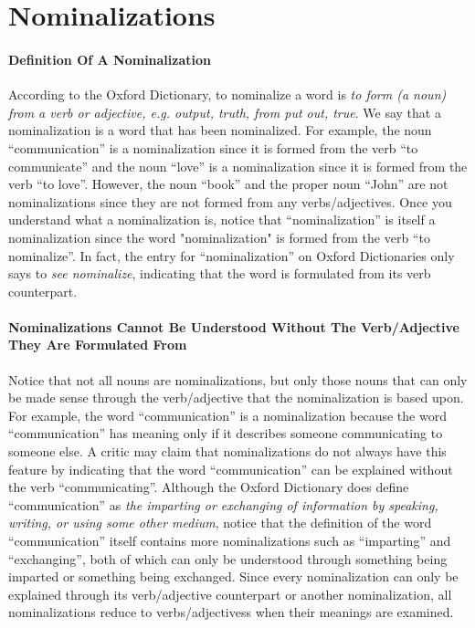 \documentclass[a4paper, 12pt]{article}
\begin{document}
\section*{Nominalizations}
\paragraph{Definition Of A Nominalization}
According to the Oxford Dictionary, to nominalize a word is \textit{to form (a noun) from a verb or adjective, e.g. output, truth, from put out, true}. We say that a nominalization is a word that has been nominalized. For example, the noun ``communication'' is a nominalization since it is formed from the verb ``to communicate'' and the noun ``love'' is a nominalization since it is formed from the verb ``to love''. However, the noun ``book'' and the proper noun ``John'' are not nominalizations since they are not formed from any verbs/adjectives. Once you understand what a nominalization is, notice that ``nominalization'' is itself a nominalization since the word "nominalization" is formed from the verb ``to nominalize''. In fact, the entry for ``nominalization'' on Oxford Dictionaries only says to \textit{see nominalize}, indicating that the word is formulated from its verb counterpart. \\
\paragraph{Nominalizations Cannot Be Understood Without The Verb/Adjective They Are Formulated From}
Notice that not all nouns are nominalizations, but only those nouns that can only be made sense through the verb/adjective that the nominalization is based upon. For example, the word ``communication'' is a nominalization because the word ``communication'' has meaning only if it describes someone communicating to someone else. A critic may claim that nominalizations do not always have this feature by indicating that the word ``communication'' can be explained without the verb ``communicating''. Although the Oxford Dictionary does define ``communication'' as \textit{the imparting or exchanging of information by speaking, writing, or using some other medium}, notice that the definition of the word ``communication'' itself contains more nominalizations such as ``imparting'' and ``exchanging'', both of which can only be understood through something being imparted or something being exchanged. Since every nominalization can only be explained through its verb/adjective counterpart or another nominalization, all nominalizations reduce to verbs/adjectivess when their meanings are examined. \\
\end{document}
